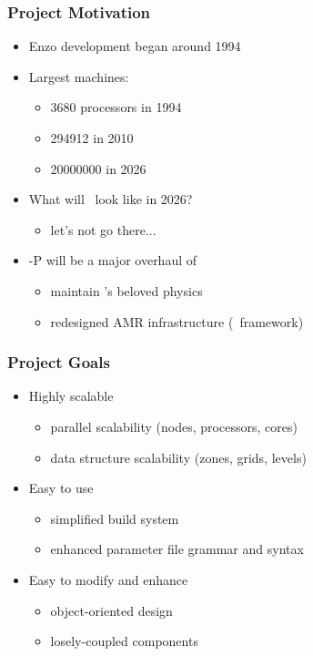 
\begin{frame}[fragile] 
\frametitle{Project Motivation}
\begin{itemize}
\item Enzo development began around 1994
\item Largest machines:
\begin{itemize}
\item    3680 processors in 1994
\item    294912  in 2010
\item    20000000 in 2026
\end{itemize}
\item What will \enzo\ look like in 2026?
\begin{itemize}
\item    let's not go there...
\end{itemize}
\item \enzo-P will be a major overhaul of \enzo
\begin{itemize}
\item    maintain \enzo's beloved physics
\item    redesigned AMR infrastructure (\cello\ framework)
\end{itemize}
\end{itemize}
\end{frame}

\begin{frame}[fragile] 
\frametitle{Project Goals}
\begin{itemize}
\item{Highly scalable}
\begin{itemize}
\item parallel scalability (nodes, processors, cores)
\item data structure scalability (zones, grids, levels)
\end{itemize}
\item{Easy to use}
\begin{itemize}
\item simplified build system
\item enhanced parameter file grammar and syntax
\end{itemize}
\item{Easy to modify and enhance}
\begin{itemize}
\item object-oriented design
\item losely-coupled components
\end{itemize}
\end{itemize}
\end{frame}

